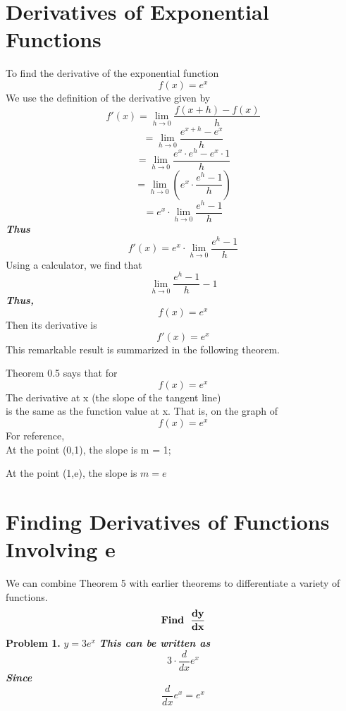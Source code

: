 \documentclass{report}
\begin{document}
\section*{Derivatives of Exponential Functions}
To find the derivative of the exponential function
$$ f(x) = e^x$$
We use the definition of the derivative given by
$$ f'(x) = \displaystyle\lim_{h\to 0}\dfrac{f(x+h)-f(x)}{h}$$
$$ = \displaystyle\lim_{h\to 0}\dfrac{e^{x+h} - e^x}{h}$$
$$ = \displaystyle\lim_{h\to 0}\dfrac{e^x \cdot e^h - e^x \cdot 1}{h}$$
$$ = \displaystyle\lim_{h\to 0} \left(e^x \cdot \dfrac{e^h - 1}{h}\right)$$
$$ = e^x \cdot \displaystyle\lim_{h\to 0}\dfrac{e^h-1}{h}$$
\textit{\textbf{Thus}}
$$f'(x) = e^x \cdot \displaystyle\lim_{h\to 0}\dfrac{e^h -1}{h}$$
\bigbreak \noindent
Using a calculator, we find that
$$ \displaystyle\lim_{h\to 0}\dfrac{e^h -1}{h} - 1$$
\textit{\textbf{Thus,}}
$$f(x) = e^x$$
Then its derivative is
$$ f'(x) = e^x$$
\bigbreak \noindent
This remarkable result is summarized in the following theorem.
\bigbreak \noindent
{}
  \bigbreak \noindent
  \begin{minipage}{0.5\textwidth}
  Theorem 0.5 says that for	
  $$f(x) = e^x$$
  The derivative at x (the slope of the tangent line) \\ is the same as the function value at x.
  \bigbreak \noindent
  That is, on the graph of
  $$f(x) =e^x$$
  For reference,
  \\ 
  At the point (0,1), the slope is m = 1; \\
  \vspace{0.5mm}

  At the point (1,e), the slope is $m = e$
  \end{minipage}
  \begin{minipage}{0.5\textwidth}
    \vspace{10mm}
  \end{minipage}
  \pagebreak
  \section*{Finding Derivatives of Functions Involving e}
  We can combine Theorem 5 with earlier theorems to differentiate a variety of functions.
  \bigbreak \noindent
  \q   $$\text{\textbf{Find}} \ \  \mathbf{\frac{dy}{dx}}$$
  \bigbreak \noindent
  \textbf{Problem 1.} $ y=3e^x$
  \bigbreak \noindent
  \textit{\textbf{This can be written as}}
  $$ 3 \cdot \frac{d}{dx}e^x$$
  \textit{\textbf{Since}}
  $$ \frac{d}{dx}e^x = e^x$$
\end{document}
